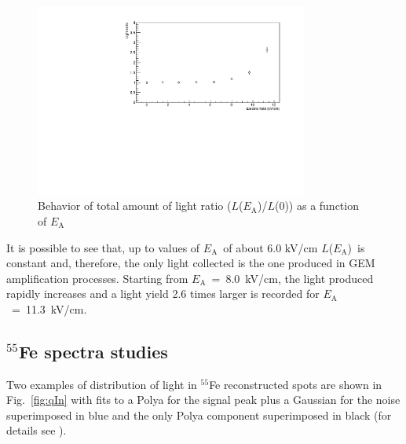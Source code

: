 \documentclass[a4paper,11pt]{article}
\newcommand{\Ea}  {$E_{\mathrm{A}}$}
\newcommand{\La}  {$L$(\Ea)}
\begin{document}
\begin{figure}[h!]
\centering
\includegraphics[width=0.80\textwidth]{gLightNorm.pdf}
\caption{Behavior of total amount of light ratio ($L$(\Ea)/$L$(0)) as a function of \Ea} 
\label{fig:light}
\end{figure}

It is possible to see that, up to values of \Ea\ of about 6.0 kV/cm \La\ is constant and, therefore, the only light collected is the one produced in GEM amplification processes. Starting from 
\Ea~=~8.0~kV/cm, the light produced rapidly increases and a light yield 2.6 times larger is recorded for \Ea~=~11.3~kV/cm.

\subsection{$^{55}$Fe spectra studies}
\label{sec:55fe}
Two examples of distribution of light in $^{55}$Fe reconstructed spots are shown in Fig.~\ref{fig:qIn} with  fits to a Polya for the signal peak plus a Gaussian for the noise superimposed in blue and the only Polya component superimposed in black (for details see \cite{bib:fe55}).
\end{document}
